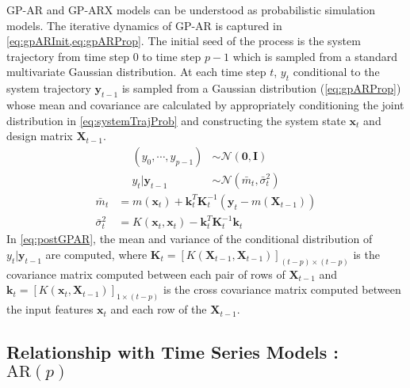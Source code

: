 GP-AR and GP-ARX models can be understood as probabilistic simulation models. %
%
The iterative dynamics of GP-AR is captured in \cref{eq:gpARInit,eq:gpARProp}. The initial seed of the process is the 
system trajectory from time step $0$ to time step $p-1$ which is sampled from a standard multivariate Gaussian distribution. 
At each time step $t$, $y_t$ conditional to the system trajectory $\mathbf{y}_{t-1}$ is sampled 
from a Gaussian distribution (\cref{eq:gpARProp}) whose mean and covariance are calculated by appropriately 
conditioning the joint distribution in \cref{eq:systemTrajProb} and constructing the system state 
$\mathbf{x}_t$ and design matrix $\mathbf{X}_{t-1}$.     
%
\begin{align}
    (y_0, \cdots, y_{p-1}) &\sim \mathcal{N}(\mathbf{0}, \mathbf{I}) \label{eq:gpARInit}\\
    y_t \rvert \mathbf{y}_{t-1} &\sim \mathcal{N}(\bar{m}_t, \bar{\sigma}_{t}^2) \label{eq:gpARProp}
\end{align}
%
\begin{equation}\label{eq:postGPAR}
    \begin{aligned}
        \bar{m}_t &= m(\mathbf{x}_t) + 
        \mathbf{k}_{t}^{T}\mathbf{K}_{t}^{-1}\left( \mathbf{y}_t - m(\mathbf{X}_{t-1}) \right) \\
        \bar{\sigma}^{2}_{t} &= K(\mathbf{x}_t, \mathbf{x}_t) - 
        \mathbf{k}_{t}^{T} \mathbf{K}_{t}^{-1} \mathbf{k}_{t}
    \end{aligned}
\end{equation}
%
In \cref{eq:postGPAR}, the mean and variance of the conditional distribution of $y_t \rvert \mathbf{y}_{t-1}$ are 
computed, where $\mathbf{K}_{t} = [K(\mathbf{X}_{t-1}, \mathbf{X}_{t-1})]_{(t-p) \times (t-p)}$ is the 
covariance matrix computed between each pair of rows of $\mathbf{X}_{t-1}$ and 
$\mathbf{k}_{t} = [K(\mathbf{x}_t, \mathbf{X}_{t-1})]_{1 \times (t-p)}$ is the cross covariance matrix computed 
between the input features $\mathbf{x}_t$ and each row of the $\mathbf{X}_{t-1}$.

\subsection*{Relationship with Time Series Models : $\mathrm{AR}(p)$}

